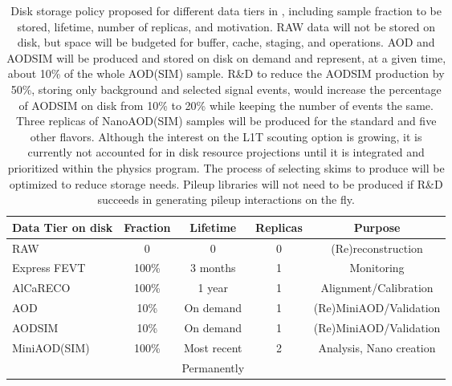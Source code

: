 \begin{table}[tbph]
    \centering
	\caption{Disk storage policy proposed for different data tiers in \RunFour, including sample fraction to be stored, lifetime, number of replicas, and motivation. RAW data will not be stored on disk, but space will be budgeted for \TierZero buffer, cache, staging, and operations. AOD and AODSIM will be produced and stored on disk on demand and represent, at a given time, about 10\% of the whole AOD(\gls{SIM}) sample. 
	R\&D to reduce the AODSIM production by 50\%, storing only background and selected signal events, would increase the percentage of AODSIM on disk from 10\% to 20\% while keeping the number of events the same. Three replicas of NanoAOD(\gls{SIM}) samples will be produced for the standard and five other flavors.
	Although the interest on the \gls{L1T} scouting option is growing, it is currently not accounted for in disk resource projections until it is integrated and prioritized within the physics program. The process of selecting skims to produce will be optimized to reduce storage needs. Pileup libraries will not need to be produced if R\&D succeeds in generating pileup interactions on the fly.}
    \begin{tabular}{|l|c|c|c|c|}
    \hline
    \rowcolor{tableheader} \hline
       Data Tier on disk   & Fraction     & Lifetime           & Replicas & Purpose                  \\ \hline
    \cellcolor{tablerowheader}
       RAW           & 0            & 0                  & 0        & (Re)reconstruction  \\
    \cellcolor{tablerowheader}
    Express FEVT     & 100\%        & 3 months           & 1        & Monitoring  \\
    \cellcolor{tablerowheader}
    AlCaRECO               & 100\%        & 1 year             & 1        & Alignment/Calibration   \\
    \cellcolor{tablerowheader}
    AOD              & 10\%         & On demand          & 1        & (Re)MiniAOD/Validation  \\
    \cellcolor{tablerowheader}
        AODSIM             & 10\%         & On demand          & 1        & (Re)MiniAOD/Validation   \\
    \cellcolor{tablerowheader}
        MiniAOD(SIM) & 100\%        & Most recent        & 2        & Analysis, Nano creation  \\
    \cellcolor{tablerowheader}
                           &              & Permanently        &          & \\  

\end{tabular}
\end{table}
